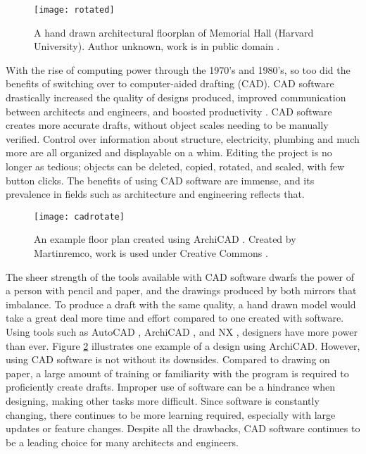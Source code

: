 \begin{figure}[ht]
\centering
\texttt{[image: rotated]}
\caption[Example of a hand drawn architectural sketch - floorplan]{A hand drawn architectural floorplan of Memorial Hall (Harvard University). Author unknown, work is in public domain \cite{harvard}.}
\label{fig:topdownsketch}
\end{figure}


With the rise of computing power through the 1970's and 1980's, so too did the benefits of switching over to computer-aided drafting (CAD). CAD software drastically increased the quality of designs produced, improved communication between architects and engineers, and boosted productivity \cite{cad}. CAD software creates more accurate drafts, without object scales needing to be manually verified. Control over information about structure, electricity, plumbing and much more are all organized and displayable on a whim. Editing the project is no longer as tedious; objects can be deleted, copied, rotated, and scaled, with few button clicks. The benefits of using CAD software are immense, and its prevalence in fields such as architecture and engineering reflects that.

\begin{figure}[ht]
\centering
\texttt{[image: cadrotate]}
\caption[Example of a room designed using CAD software]{An example floor plan created using ArchiCAD \cite{archicad}. Created by Martinremco, work is used under Creative Commons \cite{cad1}.}
\label{fig:cad1}
\end{figure}

The sheer strength of the tools available with CAD software dwarfs the power of a person with pencil and paper, and the drawings produced by both mirrors that imbalance. To produce a draft with the same quality, a hand drawn model would take a great deal more time and effort compared to one created with software. Using tools such as AutoCAD \cite{autocad}, ArchiCAD \cite{archicad}, and NX \cite{nx}, designers have more power than ever. Figure \ref{fig:cad1} illustrates one example of a design using ArchiCAD. However, using CAD software is not without its downsides. Compared to drawing on paper, a large amount of training or familiarity with the program is required to proficiently create drafts. Improper use of software can be a hindrance when designing, making other tasks more difficult. Since software is constantly changing, there continues to be more learning required, especially with large updates or feature changes. Despite all the drawbacks, CAD software continues to be a leading choice for many architects and engineers.

